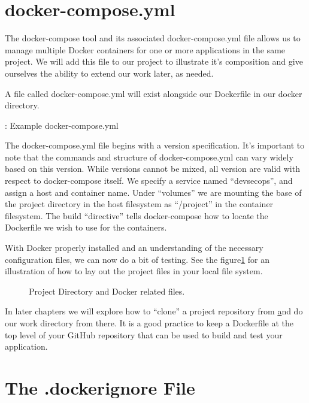 \section{docker-compose.yml}
\justifying
The docker-compose tool and its associated docker-compose.yml file allows us to manage multiple Docker containers for
one or more applications in the same project. We will add this file to our project to illustrate it's
composition and give ourselves the ability to extend our work later, as needed.

\justifying
A file called docker-compose.yml will exist
alongside our Dockerfile in our docker directory.

\begin{mybox}{\thetcbcounter: Example docker-compose.yml}
  
\end{mybox}

\justifying
The docker-compose.yml file begins with a version specification. It's important to note that the commands and structure
of docker-compose.yml can vary widely based on this version. While versions cannot be mixed, all version are valid with
respect to docker-compose itself. We specify a service named ``devsecops'', and assign a host and container name. Under
``volumes'' we are mounting the base of the project directory in the host
filesystem as ``/project'' in the container filesystem. The build
``directive'' tells docker-compose how to locate the Dockerfile we wish to use for the containers.

\justifying
With Docker properly installed and an understanding of the necessary configuration files, we can now do a bit of testing.
See the figure\ref{dockerdirectory} for an illustration of how to lay out the project files in your local file system.

\begin{figure}[!htb]
  \centering
  
  \caption{Project Directory and Docker related files.}
\label{dockerdirectory}
\end{figure}


\justifying
In later chapters we will explore how to ``clone'' a project repository from \href{github.com} and do our work directory
from there. It is a good practice to keep a Dockerfile at the top level of your GitHub repository that can be used to
build and test your application.

\section{The .dockerignore File}

